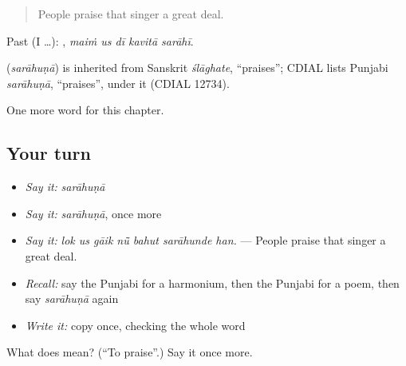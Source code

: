 \begin{quote}
People praise that singer a great deal.
\end{quote}

Past (I …):     , \emph{maiṁ us dī kavitā sarāhī}.

\begin{cousinweb}
\textbf{} (\emph{sarāhuṇā}) is inherited from Sanskrit \emph{ślāghate}, \textquotedblleft{}praises\textquotedblright{}; CDIAL lists Punjabi \emph{sarāhuṇā}, \textquotedblleft{}praises\textquotedblright{}, under it (CDIAL 12734).
\end{cousinweb}

\begin{grammarlens}[title={What you've built}]
One more word for this chapter.
\end{grammarlens}

\subsection*{Your turn}
\begin{itemize}
\raggedright
  \item \emph{Say it:} \emph{sarāhuṇā}
  \item \emph{Say it:} \emph{sarāhuṇā}, once more
  \item \emph{Say it:} \emph{lok us gāik nū̃ bahut sarāhunde han.} — People praise that singer a great deal.
  \item \emph{Recall:} say the Punjabi for a harmonium, then the Punjabi for a poem, then say \emph{sarāhuṇā} again
  \item \emph{Write it:} copy \textbf{} once, checking the whole word
\end{itemize}

\begin{tcolorbox}[breakable,colback=teal!4,colframe=teal!35!black,title={Before you move on}]
What does  mean? (\textquotedblleft{}To praise\textquotedblright{}.) Say it once more.
\end{tcolorbox}
